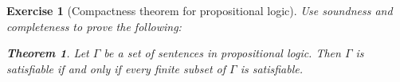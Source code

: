 \documentclass{article}
\theoremstyle{plain}
\newtheorem{Q}[theorem]{Exercise}{\bfseries}{\upshape}
\newtheorem*{theorem*}{Theorem}
\begin{document}
\begin{Q}[Compactness theorem for propositional logic]\label{\prefix compactness}
Use soundness and completeness to prove the following:
\begin{theorem*}
Let $\Gamma$ be a set of sentences in propositional logic. Then $\Gamma$ is satisfiable if and only if every finite subset of $\Gamma$ is satisfiable. 
\end{theorem*} 
\end{Q}
\begin{comment}
\textbf{Solution:}
Clearly one direction of this is trivial. If $\Gamma$ is satisfiable then every subset of $\Gamma$ must be satisfiable, finite or not. Conversely, suppose $\Gamma$ is \emph{not} satisfiable. Then $\Gamma \models \bot$. By completeness this means $\Gamma\vdash \bot$, so there is a proof of $\bot$ from $\Gamma$. But proofs are finite, and so only a finite number of sentences from $\Gamma$ will be used in this proof. Let $\Gamma'$ be the finite set of all sentences from $\Gamma$ that appear in this proof. Then $\Gamma'\vdash \bot$, and so, by soundness, we also have $\Gamma'\models \bot$. But this means $\Gamma'$ is not satisfiable. So we have shown that $\Gamma$ not being satisfiable means there is a finite subset of $\Gamma$ which is not satisfiable, and this is equivalent to saying that if every finite subset of $\Gamma$ is satisfiable then $\Gamma$ is also satisfiable, which is what we are trying to prove.
\end{comment}
\end{document}
